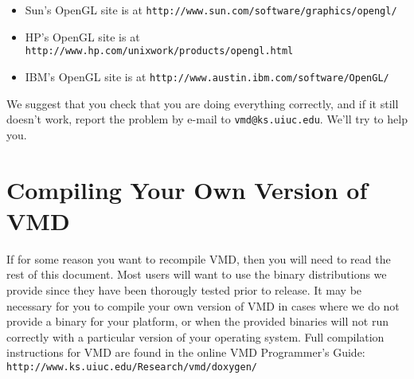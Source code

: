 \documentclass[11pt]{article}
\begin{document}
\begin{itemize}
\item Sun's OpenGL site is at {\tt http://www.sun.com/software/graphics/opengl/}
\item HP's OpenGL site is at {\tt http://www.hp.com/unixwork/products/opengl.html} 
\item IBM's OpenGL site is at {\tt http://www.austin.ibm.com/software/OpenGL/}
\end{itemize}
We suggest that you check that you are doing everything correctly,
and if it still doesn't work, report the problem by e-mail to
{\tt vmd@ks.uiuc.edu}. We'll try to help you.

 \section {Compiling Your Own Version of VMD}
   If for some reason you want to recompile VMD, then you will need to read 
 the rest of this document.  Most users will want to use the binary 
 distributions we provide since they have been thorougly tested prior to
 release.  It may be necessary for you to compile your own version of VMD
 in cases where we do not provide a binary for your platform, or
 when the provided binaries will not run correctly with a particular
 version of your operating system.  
 Full compilation instructions for VMD are found in the 
 online VMD Programmer's Guide:
   {\tt http://www.ks.uiuc.edu/Research/vmd/doxygen/}
\end{document}
